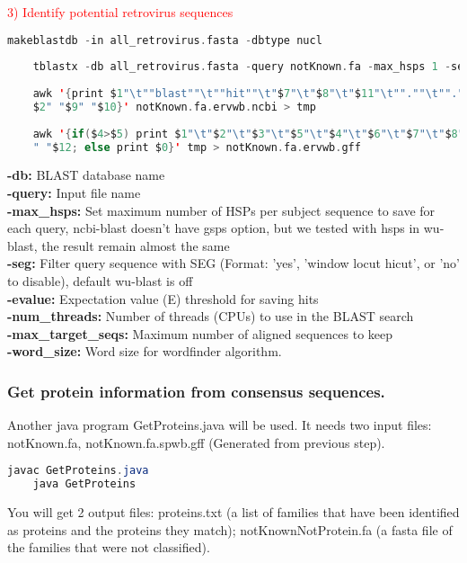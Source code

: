 \documentclass[a4paper,12pt]{article}
\begin{document}
	\noindent \textcolor{red}{3) Identify potential retrovirus sequences}
	\begin{lstlisting}[language=scala]
	makeblastdb -in all_retrovirus.fasta -dbtype nucl 
	
	tblastx -db all_retrovirus.fasta -query notKnown.fa -max_hsps 1 -seg no -evalue 0.00001 -num_threads 32 -max_target_seqs 1 -word_size 2 -outfmt 6 -out notKnown.fa.ervwb.ncbi
	
	awk '{print $1"\t""blast""\t""hit""\t"$7"\t"$8"\t"$11"\t"".""\t"".""\t""Target sp|"
	$2" "$9" "$10}' notKnown.fa.ervwb.ncbi > tmp
	
	awk '{if($4>$5) print $1"\t"$2"\t"$3"\t"$5"\t"$4"\t"$6"\t"$7"\t"$8"\t"$9" "$10" "$11
	" "$12; else print $0}' tmp > notKnown.fa.ervwb.gff \end{lstlisting}
	
	\noindent \textbf{-db:} BLAST database name \\
	\textbf{-query:} Input file name \\
	\textbf{-max\_hsps:} Set maximum number of HSPs per subject sequence to save for each query, ncbi-blast doesn't have gsps option, but we tested with hsps in wu-blast, the result remain almost the same \\
	\textbf{-seg:} Filter query sequence with SEG (Format: 'yes', 'window locut hicut', or 'no' to disable), default wu-blast is off \\
	\textbf{-evalue:} Expectation value (E) threshold for saving hits \\
	\textbf{-num\_threads:} Number of threads (CPUs) to use in the BLAST search \\
	\textbf{-max\_target\_seqs:} Maximum number of aligned sequences to keep \\
	\textbf{-word\_size:} Word size for wordfinder algorithm.
	
	\pagebreak
	
	\subsubsection{Get protein information from consensus sequences.}
	Another java program GetProteins.java will be used. It needs two input files: notKnown.fa, notKnown.fa.spwb.gff (Generated from previous step).
	\begin{lstlisting}[language=java]
	javac GetProteins.java
	java GetProteins \end{lstlisting}
	You will get 2 output files: proteins.txt (a list of families that have been identified as proteins and the proteins they match);
	notKnownNotProtein.fa (a fasta file of the families that were not classified).
	
\end{document}
